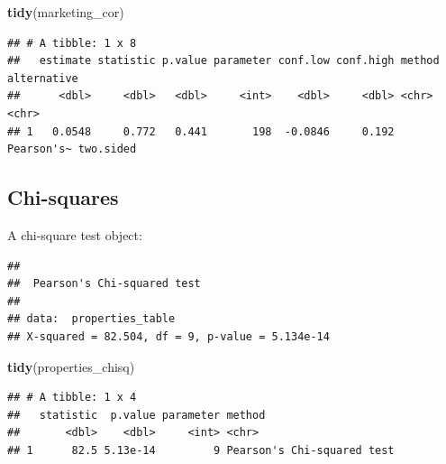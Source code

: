 \documentclass[
]{book}
\newenvironment{Shaded}{\begin{snugshade}}{\end{snugshade}}
\newcommand{\AttributeTok}[1]{\textcolor[rgb]{0.13,0.29,0.53}{#1}}
\newcommand{\ConstantTok}[1]{\textcolor[rgb]{0.56,0.35,0.01}{#1}}
\newcommand{\FunctionTok}[1]{\textcolor[rgb]{0.13,0.29,0.53}{\textbf{#1}}}
\newcommand{\NormalTok}[1]{#1}
\newcommand{\OtherTok}[1]{\textcolor[rgb]{0.56,0.35,0.01}{#1}}
\newcommand{\SpecialCharTok}[1]{\textcolor[rgb]{0.81,0.36,0.00}{\textbf{#1}}}
\newcommand{\StringTok}[1]{\textcolor[rgb]{0.31,0.60,0.02}{#1}}
\begin{document}
\begin{Shaded}
\begin{Highlighting}[]
\FunctionTok{tidy}\NormalTok{(marketing\_cor)}
\end{Highlighting}
\end{Shaded}

\begin{verbatim}
## # A tibble: 1 x 8
##   estimate statistic p.value parameter conf.low conf.high method     alternative
##      <dbl>     <dbl>   <dbl>     <int>    <dbl>     <dbl> <chr>      <chr>      
## 1   0.0548     0.772   0.441       198  -0.0846     0.192 Pearson's~ two.sided
\end{verbatim}

\hypertarget{chi-squares-1}{%
\subsection{Chi-squares}\label{chi-squares-1}}

A chi-square test object:

\begin{Shaded}
\end{Shaded}

\begin{verbatim}
## 
##  Pearson's Chi-squared test
## 
## data:  properties_table
## X-squared = 82.504, df = 9, p-value = 5.134e-14
\end{verbatim}

\begin{Shaded}
\begin{Highlighting}[]
\FunctionTok{tidy}\NormalTok{(properties\_chisq)}
\end{Highlighting}
\end{Shaded}

\begin{verbatim}
## # A tibble: 1 x 4
##   statistic  p.value parameter method                    
##       <dbl>    <dbl>     <int> <chr>                     
## 1      82.5 5.13e-14         9 Pearson's Chi-squared test
\end{verbatim}
\end{document}
